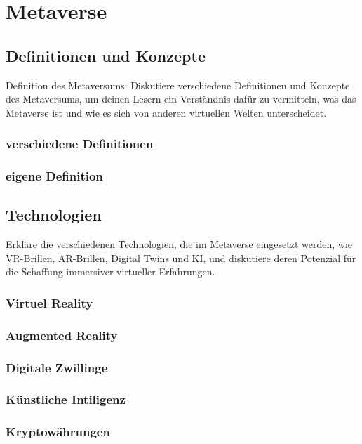 \chapter{Metaverse}\label{ch:Metaverse}

\section{Definitionen und Konzepte}
Definition des Metaversums: Diskutiere verschiedene Definitionen und Konzepte des Metaversums, um deinen Lesern ein Verständnis dafür zu vermitteln, was das Metaverse ist und wie es sich von anderen virtuellen Welten unterscheidet.


\subsection{verschiedene Definitionen}

\subsection{eigene Definition}

\section{Technologien}
Erkläre die verschiedenen Technologien, die im Metaverse eingesetzt werden, wie VR-Brillen, AR-Brillen, Digital Twins und KI, und diskutiere deren Potenzial für die Schaffung immersiver virtueller Erfahrungen.

\subsection{Virtuel Reality}
\subsection{Augmented Reality}
\subsection{Digitale Zwillinge}
\subsection{Künstliche Intiligenz}
\subsection{Kryptowährungen}



